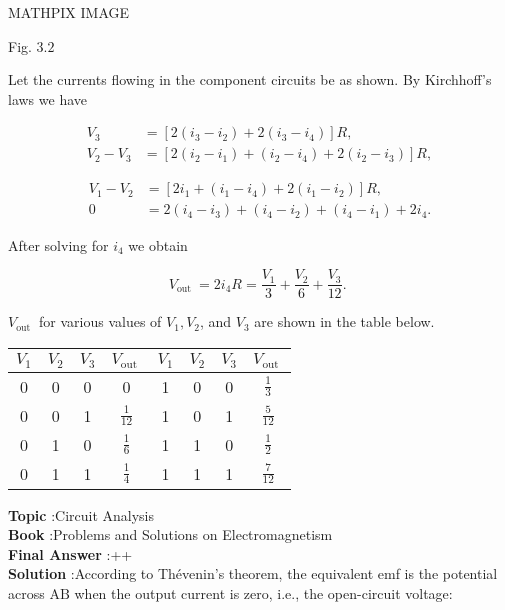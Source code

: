 \documentclass[10pt]{article}
\begin{document}
MATHPIX IMAGE

Fig. $3.2$

Let the currents flowing in the component circuits be as shown. By Kirchhoff's laws we have

$$
\begin{aligned}
V_{3} &=\left[2\left(i_{3}-i_{2}\right)+2\left(i_{3}-i_{4}\right)\right] R, \\
V_{2}-V_{3} &=\left[2\left(i_{2}-i_{1}\right)+\left(i_{2}-i_{4}\right)+2\left(i_{2}-i_{3}\right)\right] R,
\end{aligned}
$$



$$
\begin{aligned}
V_{1}-V_{2} &=\left[2 i_{1}+\left(i_{1}-i_{4}\right)+2\left(i_{1}-i_{2}\right)\right] R, \\
0 &=2\left(i_{4}-i_{3}\right)+\left(i_{4}-i_{2}\right)+\left(i_{4}-i_{1}\right)+2 i_{4} .
\end{aligned}
$$

After solving for $i_{4}$ we obtain

$$
V_{\text {out }}=2 i_{4} R=\frac{V_{1}}{3}+\frac{V_{2}}{6}+\frac{V_{3}}{12} \text {. }
$$

$V_{\text {out }}$ for various values of $V_{1}, V_{2}$, and $V_{3}$ are shown in the table below.

\begin{tabular}{|c|c|c|c||c|c|c|c|}
\hline$V_{1}$ & $V_{2}$ & $V_{3}$ & $V_{\text {out }}$ & $V_{1}$ & $V_{2}$ & $V_{3}$ & $V_{\text {out }}$ \\
\hline 0 & 0 & 0 & 0 & 1 & 0 & 0 & $\frac{1}{3}$ \\
\hline 0 & 0 & 1 & $\frac{1}{12}$ & 1 & 0 & 1 & $\frac{5}{12}$ \\
\hline 0 & 1 & 0 & $\frac{1}{6}$ & 1 & 1 & 0 & $\frac{1}{2}$ \\
\hline 0 & 1 & 1 & $\frac{1}{4}$ & 1 & 1 & 1 & $\frac{7}{12}$ \\
\hline
\end{tabular}

\textbf{Topic} :Circuit Analysis\\
\textbf{Book} :Problems and Solutions on Electromagnetism\\
\textbf{Final Answer} :++\\


\textbf{Solution} :According to Thévenin's theorem, the equivalent emf is the potential across $\mathrm{AB}$ when the output current is zero, i.e., the open-circuit voltage:
\end{document}
